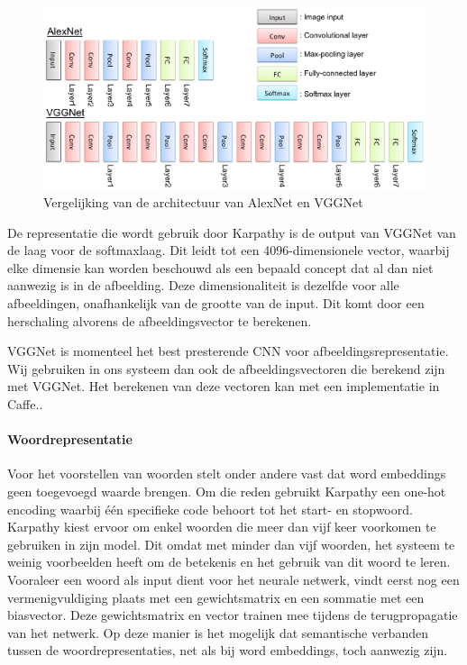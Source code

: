 \begin{figure}[tb]
    \centering
    \includegraphics[width=\linewidth]{Images/alex_vgg.eps}
    \caption{Vergelijking van de architectuur van AlexNet en VGGNet}
    \label{fig:alexvgg}
\end{figure}


De representatie die wordt gebruik door Karpathy is de output van VGGNet van de laag voor de softmaxlaag. Dit leidt tot een 4096-dimensionele vector, waarbij elke dimensie kan worden beschouwd als een bepaald concept dat al dan niet aanwezig is in de afbeelding. Deze dimensionaliteit is dezelfde voor alle afbeeldingen, onafhankelijk van de grootte van de input. Dit komt door een herschaling alvorens de afbeeldingsvector te berekenen.

VGGNet is momenteel het best presterende CNN voor afbeeldingsrepresentatie. Wij gebruiken in ons systeem dan ook de afbeeldingsvectoren die berekend zijn met VGGNet. Het berekenen van deze vectoren kan met een implementatie in Caffe.\cite{Jia2014}.

\paragraph{Woordrepresentatie}
Voor het voorstellen van woorden stelt onder andere  vast dat word embeddings geen toegevoegd waarde brengen. Om die reden gebruikt Karpathy een one-hot encoding waarbij \'e\'en specifieke code behoort tot het start- en stopwoord. Karpathy kiest ervoor om enkel woorden die meer dan vijf keer voorkomen te gebruiken in zijn model. Dit omdat met minder dan vijf woorden, het systeem te weinig voorbeelden heeft om de betekenis en het gebruik van dit woord te leren. Vooraleer een woord als input dient voor het neurale netwerk, vindt eerst nog een vermenigvuldiging plaats met een gewichtsmatrix en een sommatie met een biasvector. Deze gewichtsmatrix en vector trainen mee tijdens de terugpropagatie van het netwerk. Op deze manier is het mogelijk dat semantische verbanden tussen de woordrepresentaties, net als bij word embeddings, toch aanwezig zijn.

